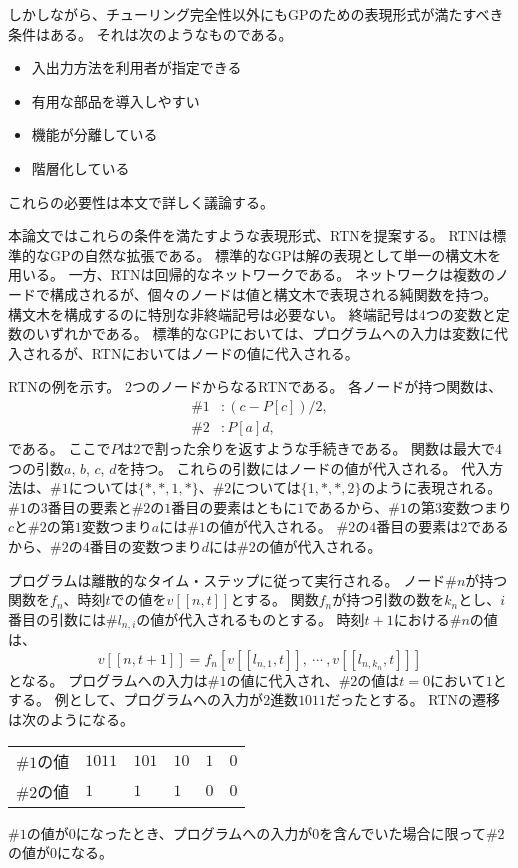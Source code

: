 \documentclass[9pt]{jsarticle}
\begin{document}
しかしながら、チューリング完全性以外にもGPのための表現形式が満たすべき条件はある。
それは次のようなものである。
\begin{itemize}
  \item 入出力方法を利用者が指定できる
  \item 有用な部品を導入しやすい
  \item 機能が分離している
  \item 階層化している
\end{itemize}
これらの必要性は本文で詳しく議論する。

本論文ではこれらの条件を満たすような表現形式、RTNを提案する。
RTNは標準的なGPの自然な拡張である。
標準的なGPは解の表現として単一の構文木を用いる。
一方、RTNは回帰的なネットワークである。
ネットワークは複数のノードで構成されるが、個々のノードは値と構文木で表現される純関数を持つ。
構文木を構成するのに特別な非終端記号は必要ない。
終端記号は$4$つの変数と定数のいずれかである。
標準的なGPにおいては、プログラムへの入力は変数に代入されるが、RTNにおいてはノードの値に代入される。

RTNの例を示す。
$2$つのノードからなるRTNである。
各ノードが持つ関数は、
\begin{align*}
\#1&: (c-P[c])/2,\\
\#2&: P[a] d,
\end{align*}
である。
ここで$P$は$2$で割った余りを返すような手続きである。
関数は最大で$4$つの引数$a$, $b$, $c$, $d$を持つ。
これらの引数にはノードの値が代入される。
代入方法は、$\#1$については$\{*, *, 1, *\}$、$\#2$については$\{1, *, *, 2\}$のように表現される。
$\#1$の$3$番目の要素と$\#2$の$1$番目の要素はともに$1$であるから、$\#1$の第$3$変数つまり$c$と$\#2$の第$1$変数つまり$a$には$\#1$の値が代入される。
$\#2$の$4$番目の要素は$2$であるから、$\#2$の$4$番目の変数つまり$d$には$\#2$の値が代入される。

プログラムは離散的なタイム・ステップに従って実行される。
ノード$\#n$が持つ関数を$f_n$、時刻$t$での値を$v[[n, t]]$とする。
関数$f_n$が持つ引数の数を$k_n$とし、$i$番目の引数には\#$l_{n,i}$の値が代入されるものとする。
時刻$t+1$における\#$n$の値は、
\[
v[[n, t+1]]=f_n[v[[l_{n,1},t]],\ \cdots\ ,v[[l_{n,k_{n}},t]]]
\]
となる。
プログラムへの入力は$\#1$の値に代入され、$\#2$の値は$t=0$において$1$とする。
例として、プログラムへの入力が$2$進数$1011$だったとする。
RTNの遷移は次のようになる。
\begin{center}
\begin{tabular}{llllll}
$\#1$の値 &$1011$ &$101$ &$10$ &$1$ &$0$\\
$\#2$の値 &$1$    &$1$   &$1$  &$0$ &$0$
\end{tabular}
\end{center}
$\#1$の値が$0$になったとき、プログラムへの入力が$0$を含んでいた場合に限って$\#2$の値が$0$になる。
\end{document}
